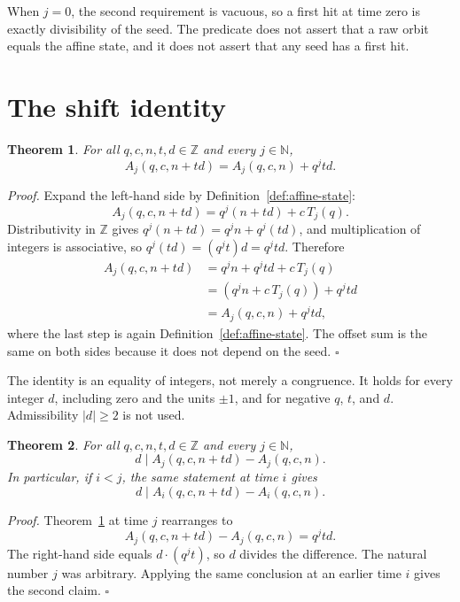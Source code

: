 \documentclass[11pt,letterpaper]{article}
\newcommand{\N}{\mathbb{N}}
\newcommand{\Z}{\mathbb{Z}}
\newtheorem{theorem}{Theorem}
\newenvironment{proof}{\noindent\textit{Proof.}}{\hfill\(\square\)}
\begin{document}
When \(j=0\), the second requirement is vacuous, so a first hit at time zero
is exactly divisibility of the seed. The predicate does not assert that a raw
orbit equals the affine state, and it does not assert that any seed has a
first hit.

\section{The shift identity}

\begin{theorem}
\label{thm:affine-class-shift}
For all \(q,c,n,t,d\in\Z\) and every \(j\in\N\),
\[
A_j(q,c,n+td)=A_j(q,c,n)+q^j td.
\]
\end{theorem}

\begin{proof}
Expand the left-hand side by Definition~\ref{def:affine-state}:
\[
A_j(q,c,n+td)=q^j(n+td)+c\,T_j(q).
\]
Distributivity in \(\Z\) gives \(q^j(n+td)=q^j n+q^j(td)\), and multiplication
of integers is associative, so \(q^j(td)=(q^j t)d=q^j td\). Therefore
\begin{align*}
A_j(q,c,n+td)
&=q^j n+q^j td+c\,T_j(q)\\
&=(q^j n+c\,T_j(q))+q^j td\\
&=A_j(q,c,n)+q^j td,
\end{align*}
where the last step is again Definition~\ref{def:affine-state}. The offset
sum is the same on both sides because it does not depend on the seed.
\end{proof}

The identity is an equality of integers, not merely a congruence. It holds
for every integer \(d\), including zero and the units \(\pm 1\), and for
negative \(q\), \(t\), and \(d\). Admissibility \(|d|\ge 2\) is not used.

\begin{theorem}
\label{thm:difference-multiple}
For all \(q,c,n,t,d\in\Z\) and every \(j\in\N\),
\[
d\mid A_j(q,c,n+td)-A_j(q,c,n).
\]
In particular, if \(i<j\), the same statement at time \(i\) gives
\[
d\mid A_i(q,c,n+td)-A_i(q,c,n).
\]
\end{theorem}

\begin{proof}
Theorem~\ref{thm:affine-class-shift} at time \(j\) rearranges to
\[
A_j(q,c,n+td)-A_j(q,c,n)=q^j td.
\]
The right-hand side equals \(d\cdot(q^j t)\), so \(d\) divides the difference.
The natural number \(j\) was arbitrary. Applying the same conclusion at an
earlier time \(i\) gives the second claim.
\end{proof}
\end{document}

